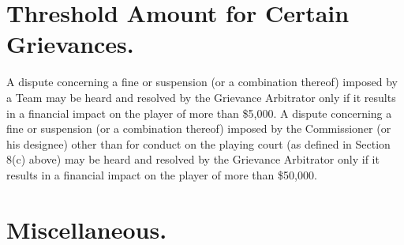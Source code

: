 \documentclass[
]{book}
\begin{document}
\hypertarget{threshold-amount-for-certain-grievances.}{%
\section{Threshold Amount for Certain Grievances.}\label{threshold-amount-for-certain-grievances.}}

A dispute concerning a fine or suspension (or a combination thereof) imposed by a Team may be heard and resolved by the Grievance Arbitrator only if it results in a financial impact on the player of more than \$5,000. A dispute concerning a fine or suspension (or a combination thereof) imposed by the Commissioner (or his designee) other than for conduct on the playing court (as defined in Section 8(c) above) may be heard and resolved by the Grievance Arbitrator only if it results in a financial impact on the player of more than \$50,000.

\hypertarget{miscellaneous.-1}{%
\section{Miscellaneous.}\label{miscellaneous.-1}}
\end{document}

